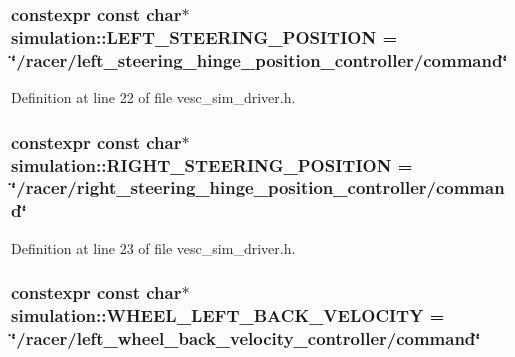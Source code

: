 \subsubsection[{\texorpdfstring{L\+E\+F\+T\+\_\+\+S\+T\+E\+E\+R\+I\+N\+G\+\_\+\+P\+O\+S\+I\+T\+I\+ON}{LEFT_STEERING_POSITION}}]{\setlength{\rightskip}{0pt plus 5cm}constexpr const char$\ast$ simulation\+::\+L\+E\+F\+T\+\_\+\+S\+T\+E\+E\+R\+I\+N\+G\+\_\+\+P\+O\+S\+I\+T\+I\+ON = \char`\"{}/racer/left\+\_\+steering\+\_\+hinge\+\_\+position\+\_\+controller/command\char`\"{}}\hypertarget{namespacesimulation_aeabd7d3863831a7fc50ce8728ca46885}{}\label{namespacesimulation_aeabd7d3863831a7fc50ce8728ca46885}


Definition at line 22 of file vesc\+\_\+sim\+\_\+driver.\+h.

\subsubsection[{\texorpdfstring{R\+I\+G\+H\+T\+\_\+\+S\+T\+E\+E\+R\+I\+N\+G\+\_\+\+P\+O\+S\+I\+T\+I\+ON}{RIGHT_STEERING_POSITION}}]{\setlength{\rightskip}{0pt plus 5cm}constexpr const char$\ast$ simulation\+::\+R\+I\+G\+H\+T\+\_\+\+S\+T\+E\+E\+R\+I\+N\+G\+\_\+\+P\+O\+S\+I\+T\+I\+ON = \char`\"{}/racer/right\+\_\+steering\+\_\+hinge\+\_\+position\+\_\+controller/command\char`\"{}}\hypertarget{namespacesimulation_af34d70ba82e8343343521a32e5f6b12a}{}\label{namespacesimulation_af34d70ba82e8343343521a32e5f6b12a}


Definition at line 23 of file vesc\+\_\+sim\+\_\+driver.\+h.

\subsubsection[{\texorpdfstring{W\+H\+E\+E\+L\+\_\+\+L\+E\+F\+T\+\_\+\+B\+A\+C\+K\+\_\+\+V\+E\+L\+O\+C\+I\+TY}{WHEEL_LEFT_BACK_VELOCITY}}]{\setlength{\rightskip}{0pt plus 5cm}constexpr const char$\ast$ simulation\+::\+W\+H\+E\+E\+L\+\_\+\+L\+E\+F\+T\+\_\+\+B\+A\+C\+K\+\_\+\+V\+E\+L\+O\+C\+I\+TY = \char`\"{}/racer/left\+\_\+wheel\+\_\+back\+\_\+velocity\+\_\+controller/command\char`\"{}}\hypertarget{namespacesimulation_a7a04e98990d834217946c9be604088ee}{}\label{namespacesimulation_a7a04e98990d834217946c9be604088ee}


